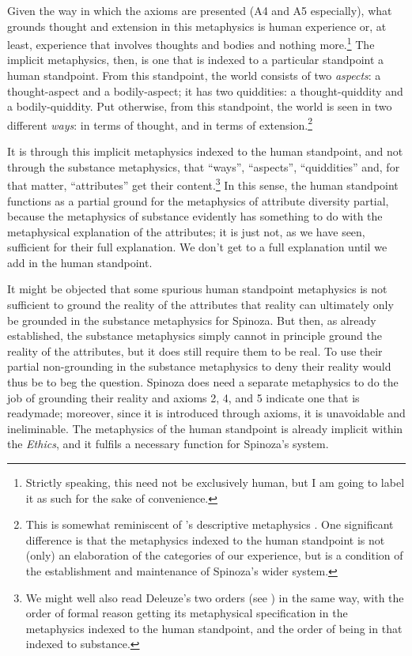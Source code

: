 \documentclass[11pt]{article}
\newcommand{\dash}{\unskip{---}}
\newcommand\texttitle[1]{\emph{#1}}
\begin{document}
	Given the way in which the axioms are presented (A4 and A5 especially), what grounds thought and extension in this metaphysics is human experience \dash or, at least, experience that involves thoughts and bodies and nothing more.\footnote{Strictly speaking, this need not be exclusively human, but I am going to label it as such for the sake of convenience.} The implicit metaphysics, then, is one that is indexed to a particular standpoint \dash a human standpoint. From this standpoint, the world consists of two \emph{aspects}: a thought-aspect and a bodily-aspect; it has two quiddities:  a thought-quiddity and a bodily-quiddity. Put otherwise, from this standpoint, the world is seen in two different \emph{ways}: in terms of thought, and in terms of extension.\footnote{This is somewhat reminiscent of \citeauthor{StrawsonIndividuals}'s descriptive metaphysics \autocite{StrawsonIndividuals}. One significant difference is that the metaphysics indexed to the human standpoint is not (only) an elaboration of the categories of our experience, but is a condition of the establishment and maintenance of Spinoza's wider system.}
	
	It is through this implicit metaphysics indexed to the human standpoint, and not through the substance metaphysics, that \enquote{ways}, \enquote{aspects}, \enquote{quiddities} \dash and, for that matter, \enquote{attributes} \dash get their content.\footnote{We might well also read Deleuze's two orders (see ) in the same way, with the order of formal reason getting its metaphysical specification in the metaphysics indexed to the human standpoint, and the order of being in that indexed to substance.} In this sense, the human standpoint functions as a partial ground for the metaphysics of attribute diversity \dash partial, because the metaphysics of substance evidently has something to do with the metaphysical explanation of the attributes; it is just not, as we have seen, sufficient for their full explanation. We don't get to a full explanation until we add in the human standpoint.
	
	It might be objected that some spurious human standpoint metaphysics is not sufficient to ground the reality of the attributes \dash that reality can ultimately only be grounded in the substance metaphysics for Spinoza. But then, as already established, the substance metaphysics simply cannot in principle ground the reality of the attributes, but it does still require them to be real. To use their partial non-grounding in the substance metaphysics to deny their reality would thus be to beg the question. Spinoza does need a separate metaphysics to do the job of grounding their reality \dash and axioms 2, 4, and 5 indicate one that is readymade; moreover, since it is introduced through axioms, it is unavoidable and ineliminable. The metaphysics of the human standpoint is already implicit within the \texttitle{Ethics}, and it fulfils a necessary function for Spinoza’s system.
	
\end{document}

